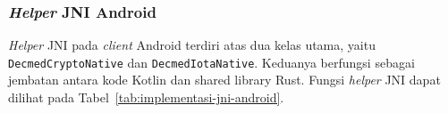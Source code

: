 


\subsubsection{\textit{Helper} JNI Android}

\textit{Helper} JNI pada \textit{client} Android terdiri atas dua kelas utama, yaitu \texttt{DecmedCryptoNative} dan \texttt{DecmedIotaNative}. 
Keduanya berfungsi sebagai jembatan antara kode Kotlin dan shared library Rust. 
Fungsi \textit{helper} JNI dapat dilihat pada Tabel~\ref{tab:implementasi-jni-android}.

